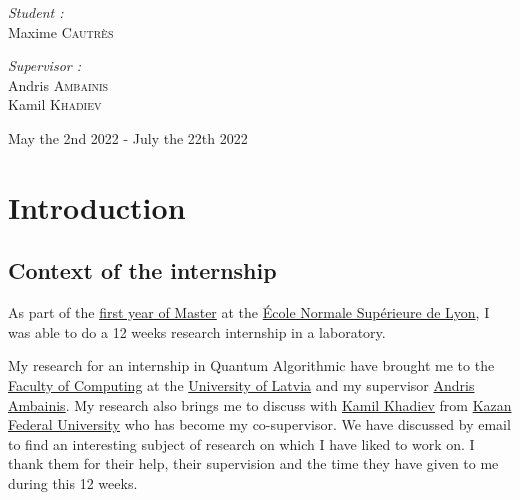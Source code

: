 \documentclass[11pt,a4paper]{article}
\theoremstyle{definition}
\theoremstyle{plain}
\theoremstyle{definition}
\begin{document}
\begin{titlepage}
\begin{sffamily}
\begin{center}
            \hspace{-0.8cm}
            \begin{minipage}{0.4\textwidth}
                \begin{flushleft} \large
                    \emph{Student :} \\
                    Maxime \textsc{Cautrès}\\
                \end{flushleft}
            \end{minipage}
            \hspace{3cm}
            \begin{minipage}{0.4\textwidth}
                \begin{flushright} \large
                    \emph{Supervisor :} \\
                    Andris \textsc{Ambainis}\\
                    Kamil \textsc{Khadiev}\\
                \end{flushright}
            \end{minipage}

            \vspace*{0.5cm}
            {\large   May the 2nd 2022 -  July the 22th 2022}
        \end{center}
    \end{sffamily}
\end{titlepage}

\tableofcontents

\newpage




\section{Introduction}

\subsection*{Context of the internship}

As part of the \href{http://informatique.ens-lyon.fr/en/academic-programs/master/m1}{first year of Master} at the
\href{http://www.ens-lyon.fr/en/}{École Normale Supérieure de Lyon},
I was able to do a 12 weeks research internship in a laboratory.

My research for an internship in Quantum Algorithmic have brought me to
the \href{https://www.lu.lv/en/studies/faculties/faculty-of-computing/}{Faculty of Computing}
at the \href{https://www.lu.lv/}{University of Latvia}
and my supervisor \href{http://home.lu.lv/~ambainis/}{Andris Ambainis}. My research also
brings me to discuss with \href{https://kpfu.ru/Kamil.Hadiev?p_lang=2}{Kamil Khadiev}
from \href{https://eng.kpfu.ru/}{Kazan Federal University} who has become my co-supervisor.
We have discussed by email to find an interesting subject of research on which I have
liked to work on. I thank them for their help, their supervision and the time they have
given to me during this 12 weeks.
\end{document}
